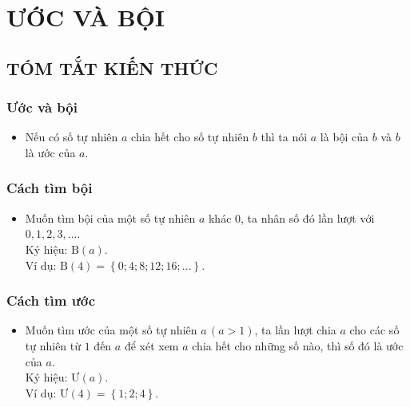 \section{ƯỚC VÀ BỘI}
\subsection{TÓM TẮT KIẾN THỨC}
\begin{tomtat}
	\subsubsection{Ước và bội}
\begin{itemize}
\item Nếu có số tự nhiên $a$ chia hết cho số tự nhiên $b$ thì ta nói $a$ là bội của $b$ và $b$ là ước của $a$.
\end{itemize}
	\subsubsection{Cách tìm bội}
\begin{itemize}
\item Muốn tìm bội của một số tự nhiên $a$ khác $0$, ta nhân số đó lần lượt với $0, 1, 2, 3, ...$.\\
Ký hiệu: $\text{B}\left( a \right)$.\\
Ví dụ: $\text{B}\left( 4 \right) = \left\{ {0;4;8;12;16;...} \right\}$.
\end{itemize}
	\subsubsection{Cách tìm ước}
\begin{itemize}
\item Muốn tìm ước của một số tự nhiên $a\,\left( {a > 1}\right)$, ta lần lượt chia $a$ cho các số tự nhiên từ $1$ đến $a$ để xét xem $a$ chia hết cho những số nào, thì số đó là ước của $a$.\\
Ký hiệu: $\text{Ư}\left( a \right)$.\\
Ví dụ: $\text{Ư}\left( 4 \right) = \left\{ {1;2;4} \right\}$.
\end{itemize}
\end{tomtat}
